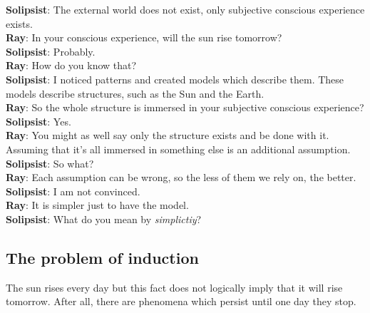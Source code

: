 \documentclass[oneside,hidelinks]{article}
\begin{document}
{\setlength\parindent{0pt}
\textbf{Solipsist}: The external world does not exist, only subjective conscious experience exists.\\

\textbf{Ray}: In your conscious experience, will the sun rise tomorrow?\\

\textbf{Solipsist}: Probably.\\

\textbf{Ray}: How do you know that?\\

\textbf{Solipsist}: I noticed patterns and created models which describe them. These models describe structures, such as the Sun and the Earth.\\

\textbf{Ray}: So the whole structure is immersed in your subjective conscious experience?\\

\textbf{Solipsist}: Yes.\\

\textbf{Ray}: You might as well say only the structure exists and be done with it. Assuming that it's all immersed in something else is an additional assumption.\\

\textbf{Solipsist}: So what?\\

\textbf{Ray}: Each assumption can be wrong, so the less of them we rely on, the better.\\

\textbf{Solipsist}: I am not convinced.\\

\textbf{Ray}: It is simpler just to have the model.\\

\textbf{Solipsist}: What do you mean by \textit{simplictiy}?\\
}

\newpage

\subsection{The problem of induction}

The sun rises every day but this fact does not logically imply that it will rise tomorrow.
After all, there are phenomena which persist until one day they stop.\\
\end{document}
